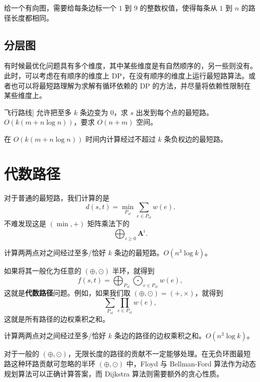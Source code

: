 \begin{exercise}[P5590 赛车游戏]
    给一个有向图，需要给每条边标一个 $1$ 到 $9$ 的整数权值，使得每条从 $1$ 到 $n$ 的路径长度都相同。
\end{exercise}

\subsection{分层图}

有时候最优化问题具有多个维度，其中某些维度是有自然顺序的，另一些则没有。此时，可以考虑在有顺序的维度上 DP，在没有顺序的维度上运行最短路算法。或者也可以将最短路理解为求解有循环依赖的 DP 的方法，并尽量将依赖性限制在某些维度上。

\begin{example}[P4568 [JLOI2011] 飞行路线]
    允许把至多 $k$ 条边变为 $0$，求 $s$ 出发到每个点的最短路。$O(k(m+n\log n))$，要求 $O(n+m)$ 空间。
\end{example}

\begin{exercise}
    在 $O(k(m+n\log n))$ 时间内计算经过不超过 $k$ 条负权边的最短路。
\end{exercise}

\section{代数路径}

对于普通的最短路，我们计算的是
$$
d(s,t)=\min_{P_{st}} \sum_{e\in P_{st}} w(e).
$$
不难发现这是 $(\min,+)$ 矩阵乘法下的
$$
\bigoplus_{i\ge 0} \mathbf A^i.
$$
\begin{exercise}
    计算两两点对之间经过至多/恰好 $k$ 条边的最短路。$O(n^3\log k)$。
\end{exercise}


如果将其一般化为任意的 $(\oplus,\odot)$ 半环，就得到
$$
f(s,t)=\bigoplus_{P_{st}} \bigodot_{e\in P_{st}} w(e),
$$
这就是\textbf{代数路径}问题。例如，如果我们取 $(\oplus,\odot)=(+,\times)$，就得到
$$
\sum_{P_{st}}\prod_{e\in P_{st}} w(e),
$$
这就是所有路径的边权乘积之和。

\begin{exercise}
    计算两两点对之间经过至多/恰好 $k$ 条边的路径的边权乘积之和。$O(n^3\log k)$。
\end{exercise}

对于一般的 $(\oplus,\odot)$，无限长度的路径的贡献不一定能够处理。在无负环图最短路这种环路贡献可忽略的半环 $(\oplus,\odot)$ 中，Floyd 与 Bellman-Ford 算法作为动态规划算法可以正确计算答案，而 Dijkstra 算法则需要额外的贪心性质。

